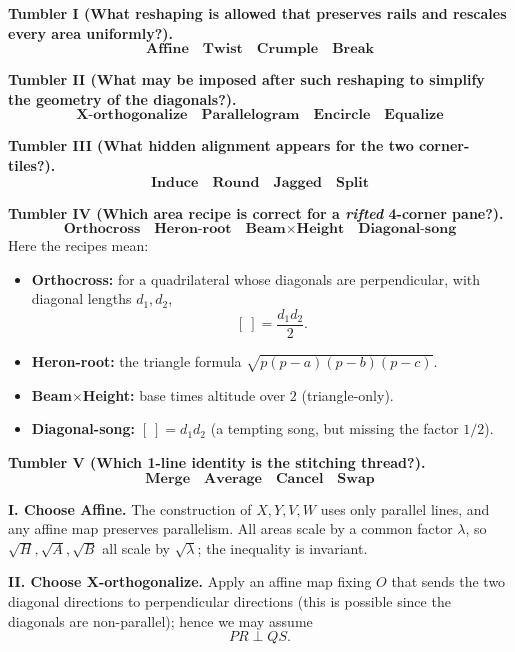 \medskip

\noindent\textbf{Tumbler I (What reshaping is allowed that preserves rails and rescales every area uniformly?).}
\[
\boxed{\textbf{Affine}}\quad\boxed{\textbf{Twist}}\quad\boxed{\textbf{Crumple}}\quad\boxed{\textbf{Break}}
\]

\noindent\textbf{Tumbler II (What may be imposed after such reshaping to simplify the geometry of the diagonals?).}
\[
\boxed{\textbf{X-orthogonalize}}\quad\boxed{\textbf{Parallelogram}}\quad\boxed{\textbf{Encircle}}\quad\boxed{\textbf{Equalize}}
\]

\noindent\textbf{Tumbler III (What hidden alignment appears for the two corner-tiles?).}
\[
\boxed{\textbf{Induce}}\quad\boxed{\textbf{Round}}\quad\boxed{\textbf{Jagged}}\quad\boxed{\textbf{Split}}
\]

\noindent\textbf{Tumbler IV (Which area recipe is correct for a \emph{rifted} 4-corner pane?).}
\[
\boxed{\textbf{Orthocross}}\quad\boxed{\textbf{Heron-root}}\quad\boxed{\textbf{Beam}\times\textbf{Height}}\quad\boxed{\textbf{Diagonal-song}}
\]
Here the recipes mean:
\begin{itemize}
\item \textbf{Orthocross:} for a quadrilateral whose diagonals are perpendicular, with diagonal lengths \(d_1,d_2\),
\[
[\ ]=\frac{d_1d_2}{2}.
\]
\item \textbf{Heron-root:} the triangle formula \(\sqrt{p(p-a)(p-b)(p-c)}\).
\item \textbf{Beam}\(\times\)\textbf{Height:} base times altitude over \(2\) (triangle-only).
\item \textbf{Diagonal-song:} \([\ ]=d_1d_2\) (a tempting song, but missing the factor \(1/2\)).
\end{itemize}

\noindent\textbf{Tumbler V (Which 1-line identity is the stitching thread?).}
\[
\boxed{\textbf{Merge}}\quad\boxed{\textbf{Average}}\quad\boxed{\textbf{Cancel}}\quad\boxed{\textbf{Swap}}
\]


\medskip
{}

\SolutionPage

\textbf{I. Choose \textbf{Affine}.} The construction of \(X,Y,V,W\) uses only parallel lines, and any affine map preserves parallelism.
All areas scale by a common factor \(\lambda\), so \(\sqrt{H},\sqrt{A},\sqrt{B}\) all scale by \(\sqrt\lambda\); the inequality is invariant.

\smallskip

\textbf{II. Choose \textbf{X-orthogonalize}.} Apply an affine map fixing \(O\) that sends the two diagonal directions to perpendicular directions (this is possible since the diagonals are non-parallel); hence we may assume
\[
PR\perp QS.
\]

